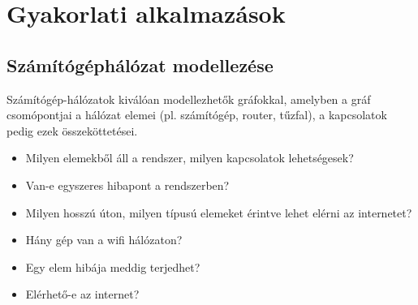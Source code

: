 %
%
%
%
%
%
%
%
%
%
%
%
%

\section{Gyakorlati alkalmazások}

\subsection{Számítógéphálózat modellezése}

Számítógép-hálózatok kiválóan modellezhetők gráfokkal, amelyben a gráf csomópontjai a hálózat elemei (pl. számítógép, router, tűzfal), a kapcsolatok pedig ezek összeköttetései.


\begin{itemize}
	\item Milyen elemekből áll a rendszer, milyen kapcsolatok lehetségesek?
	\item Van-e egyszeres hibapont a rendszerben?
	\item Milyen hosszú úton, milyen típusú elemeket érintve lehet elérni az internetet?
	\item Hány gép van a wifi hálózaton?
	\item Egy elem hibája meddig terjedhet?
	\item Elérhető-e az internet?
\end{itemize}

